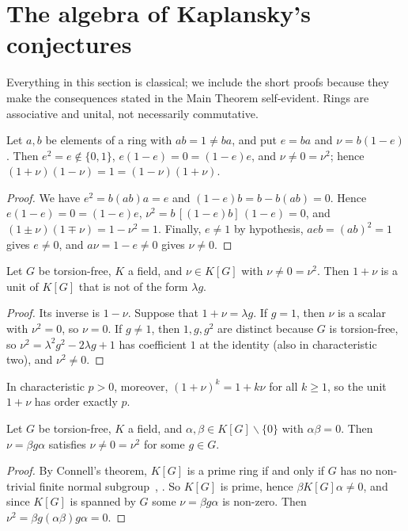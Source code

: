 \documentclass[11pt]{article}
\theoremstyle{definition}
\theoremstyle{plain}
\begin{document}
\section{The algebra of Kaplansky's conjectures}\label{sec:algebra}

Everything in this section is classical; we include the short proofs because they make the consequences stated in the Main Theorem self-evident. Rings are associative and unital, not necessarily commutative.

\begin{lemma}\label{lem:onesided}
Let $a,b$ be elements of a ring with $ab=1\neq ba$, and put $e=ba$ and $\nu=b(1-e)$. Then $e^2=e\notin\{0,1\}$, $e(1-e)=0=(1-e)e$, and $\nu\neq0=\nu^2$; hence $(1+\nu)(1-\nu)=1=(1-\nu)(1+\nu)$.
\end{lemma}

\begin{proof}
We have $e^2=b(ab)a=e$ and $(1-e)b=b-b(ab)=0$. Hence $e(1-e)=0=(1-e)e$, $\nu^2=b\,[(1-e)b]\,(1-e)=0$, and $(1\pm\nu)(1\mp\nu)=1-\nu^2=1$. Finally, $e\neq1$ by hypothesis, $aeb=(ab)^2=1$ gives $e\neq0$, and $a\nu=1-e\neq0$ gives $\nu\neq0$.
\end{proof}

\begin{lemma}\label{lem:unit}
Let $G$ be torsion-free, $K$ a field, and $\nu\in K[G]$ with $\nu\neq0=\nu^2$. Then $1+\nu$ is a unit of $K[G]$ that is not of the form $\lambda g$.
\end{lemma}

\begin{proof}
Its inverse is $1-\nu$. Suppose that $1+\nu=\lambda g$. If $g=1$, then $\nu$ is a scalar with $\nu^2=0$, so $\nu=0$. If $g\neq1$, then $1,g,g^2$ are distinct because $G$ is torsion-free, so $\nu^2=\lambda^2g^2-2\lambda g+1$ has coefficient $1$ at the identity (also in characteristic two), and $\nu^2\neq0$.
\end{proof}
In characteristic $p>0$, moreover, $(1+\nu)^k=1+k\nu$ for all $k\ge1$, so the unit $1+\nu$ has order exactly $p$.


\begin{lemma}\label{lem:connell}
Let $G$ be torsion-free, $K$ a field, and $\alpha,\beta\in K[G]\smallsetminus\{0\}$ with $\alpha\beta=0$. Then $\nu=\beta g\alpha$ satisfies $\nu\neq0=\nu^2$ for some $g\in G$.
\end{lemma}

\begin{proof}
By Connell's theorem, $K[G]$ is a prime ring if and only if $G$ has no non-trivial finite normal subgroup~\cite{Connell1963}, \cite[Thm.~4.2.10]{Passman1977}. So $K[G]$ is prime, hence $\beta K[G]\alpha\neq0$, and since $K[G]$ is spanned by $G$ some $\nu=\beta g\alpha$ is non-zero. Then $\nu^2=\beta g(\alpha\beta)g\alpha=0$.
\end{proof}
\end{document}
